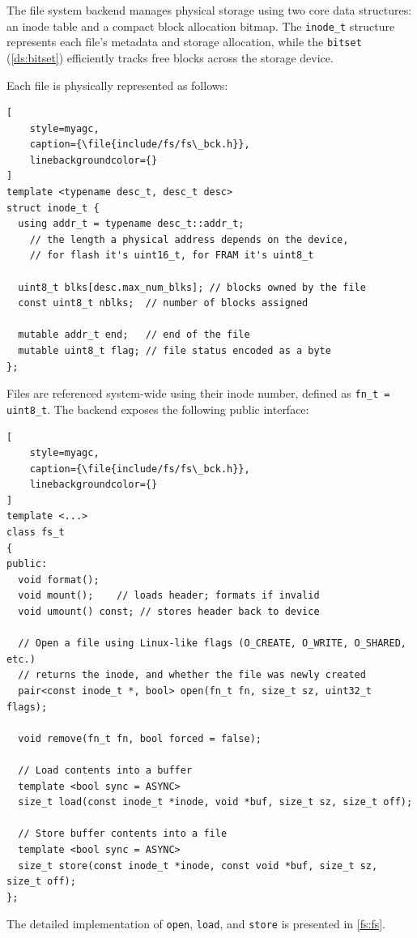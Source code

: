 The file system backend manages physical storage using two core data structures: an
inode table and a compact block allocation bitmap. The \lstinline[style=myagc]|inode_t|
structure represents each file's metadata and storage allocation, while the
\lstinline[style=myagc]|bitset| (\autoref{ds:bitset}) efficiently tracks free blocks
across the storage device.

Each file is physically represented as follows:

\begin{lstlisting}[
    style=myagc,
    caption={\file{include/fs/fs\_bck.h}},
    linebackgroundcolor={}
]
template <typename desc_t, desc_t desc>
struct inode_t {
  using addr_t = typename desc_t::addr_t;
    // the length a physical address depends on the device,
    // for flash it's uint16_t, for FRAM it's uint8_t

  uint8_t blks[desc.max_num_blks]; // blocks owned by the file
  const uint8_t nblks;  // number of blocks assigned

  mutable addr_t end;   // end of the file
  mutable uint8_t flag; // file status encoded as a byte
};
\end{lstlisting}

Files are referenced system-wide using their inode number, defined as
\lstinline[style=myagc]|fn_t = uint8_t|. The backend exposes the following public
interface:

\begin{lstlisting}[
    style=myagc,
    caption={\file{include/fs/fs\_bck.h}},
    linebackgroundcolor={}
]
template <...>
class fs_t
{
public:
  void format();
  void mount();    // loads header; formats if invalid
  void umount() const; // stores header back to device

  // Open a file using Linux-like flags (O_CREATE, O_WRITE, O_SHARED, etc.)
  // returns the inode, and whether the file was newly created
  pair<const inode_t *, bool> open(fn_t fn, size_t sz, uint32_t flags);

  void remove(fn_t fn, bool forced = false);

  // Load contents into a buffer
  template <bool sync = ASYNC>
  size_t load(const inode_t *inode, void *buf, size_t sz, size_t off);

  // Store buffer contents into a file
  template <bool sync = ASYNC>
  size_t store(const inode_t *inode, const void *buf, size_t sz, size_t off);
};
\end{lstlisting}

The detailed implementation of \lstinline[style=myagc]|open|, \lstinline[style=myagc]|load|, and \lstinline[style=myagc]|store| is presented in \autoref{fs:fs}.

